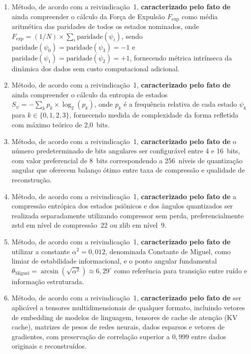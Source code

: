 \documentclass[12pt,a4paper]{article}
\newcommand{\alphaii}{\alpha^2}
\newcommand{\thetaM}{\theta_{\text{Miguel}}}
\newcommand{\Fexp}{F_{\text{exp}}}
\begin{document}
\begin{enumerate}
\item Método, de acordo com a reivindicação~1,
\textbf{caracterizado pelo fato de} ainda compreender o cálculo
da Força de Expulsão $\Fexp$ como média aritmética das
paridades de todos os estados nominados, onde
$\Fexp = (1/N) \times \sum_i \text{paridade}(\psi_i)$, sendo
$\text{paridade}(\psi_0) = \text{paridade}(\psi_3) = -1$ e
$\text{paridade}(\psi_1) = \text{paridade}(\psi_2) = +1$,
fornecendo métrica intrínseca da dinâmica dos dados sem custo
computacional adicional.

\item Método, de acordo com a reivindicação~1,
\textbf{caracterizado pelo fato de} ainda compreender o cálculo
da entropia de estados
$S_\psi = -\sum_k p_k \times \log_2(p_k)$, onde $p_k$ é a
frequência relativa de cada estado $\psi_k$ para
$k \in \{0, 1, 2, 3\}$, fornecendo medida de complexidade da
forma refletida com máximo teórico de 2,0~bits.

\item Método, de acordo com a reivindicação~1,
\textbf{caracterizado pelo fato de} o número predeterminado de
bits angulares ser configurável entre 4 e 16~bits, com valor
preferencial de 8~bits correspondendo a 256~níveis de
quantização angular que oferecem balanço ótimo entre taxa de
compressão e qualidade de reconstrução.

\item Método, de acordo com a reivindicação~1,
\textbf{caracterizado pelo fato de} a compressão entrópica dos
estados psiônicos e dos ângulos quantizados ser realizada
separadamente utilizando compressor sem perda,
preferencialmente zstd em nível de compressão~22 ou zlib em
nível~9.

\item Método, de acordo com a reivindicação~1,
\textbf{caracterizado pelo fato de} utilizar a constante
$\alphaii = 0{,}012$, denominada Constante de Miguel, como
limiar de estabilidade informacional, e o ponto angular
fundamental $\thetaM = \arcsin(\sqrt{\alphaii}) \approx
6{,}29^\circ$ como referência para transição entre ruído e
informação estruturada.

\item Método, de acordo com a reivindicação~1,
\textbf{caracterizado pelo fato de} ser aplicável a tensores
multidimensionais de qualquer formato, incluindo vetores de
embedding de modelos de linguagem, tensores de cache de atenção
(KV cache), matrizes de pesos de redes neurais, dados esparsos
e vetores de gradientes, com preservação de correlação superior
a $0{,}999$ entre dados originais e reconstruídos.


\end{enumerate}
\end{document}
